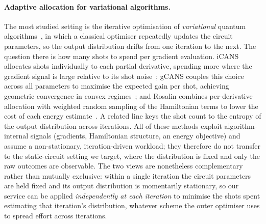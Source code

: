 \documentclass[runningheads]{llncs}
\begin{document}
\paragraph{Adaptive allocation for variational algorithms.} The most studied
setting is the iterative optimisation of \emph{variational} quantum
algorithms~\cite{cerezo2021vqa,kandala2017vqe}, in which a classical optimiser
repeatedly updates the circuit parameters, so the output distribution drifts from
one iteration to the next. The question there is how many shots to spend per
gradient evaluation. iCANS allocates shots individually to each partial
derivative, spending more where the gradient signal is large relative to its
shot noise~\cite{kubler2020icans}; gCANS couples this choice across all
parameters to maximise the expected gain per shot, achieving geometric
convergence in convex regimes~\cite{gu2021gcans}; and Rosalin combines
per-derivative allocation with weighted random sampling of the Hamiltonian terms
to lower the cost of each energy estimate~\cite{arrasmith2020rosalin}. A related
line keys the shot count to the entropy of the output distribution across
iterations. All of these methods exploit algorithm-internal signals (gradients,
Hamiltonian structure, an energy objective) and assume a non-stationary,
iteration-driven workload; they therefore do not transfer to the static-circuit
setting we target, where the distribution is fixed and only the raw outcomes are
observable. The two views are nonetheless complementary rather than mutually
exclusive: within a single iteration the circuit parameters are held fixed and
its output distribution is momentarily stationary, so our service can be applied
\emph{independently at each iteration} to minimise the shots spent estimating
that iteration's distribution, whatever scheme the outer optimiser uses to
spread effort across iterations.
\end{document}
